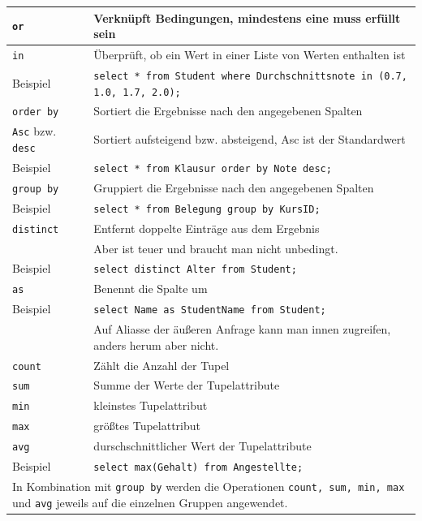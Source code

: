 \documentclass{article}
\begin{document}
\begin{center}
\begin{longtable}{|p{4cm}|p{7cm}|}
    \hline
    \texttt{or} & Verknüpft Bedingungen, mindestens eine muss erfüllt sein \\
    \hline
    \texttt{in} & Überprüft, ob ein Wert in einer Liste von Werten enthalten ist \\
    \hline
    Beispiel & \texttt{select * from Student where Durchschnittsnote in (0.7, 1.0, 1.7, 2.0);} \\
    \hline
    \texttt{order by} & Sortiert die Ergebnisse nach den angegebenen Spalten \\
    \hline
    \texttt{Asc} bzw. \texttt{desc} & Sortiert aufsteigend bzw. absteigend, Asc ist der Standardwert \\
    \hline
    Beispiel & \texttt{select * from Klausur order by Note desc;} \\
    \hline
    \texttt{group by} & Gruppiert die Ergebnisse nach den angegebenen Spalten \\
    \hline
    Beispiel & \texttt{select * from Belegung group by KursID;} \\
    \hline
    \texttt{distinct} & Entfernt doppelte Einträge aus dem Ergebnis \\
    & Aber ist teuer und braucht man nicht unbedingt.\\
    \hline
    Beispiel & \texttt{select distinct Alter from Student;} \\
    \hline
    \texttt{as} & Benennt die Spalte um \\
    Beispiel & \texttt{select Name as StudentName from Student;} \\
    & Auf Aliasse der äußeren Anfrage kann man innen zugreifen, anders herum aber nicht. \\
    \hline
    \texttt{count} & Zählt die Anzahl der Tupel \\
    \hline
    \texttt{sum} & Summe der Werte der Tupelattribute \\
    \hline
    \texttt{min} & kleinstes Tupelattribut \\
    \hline
    \texttt{max} & größtes Tupelattribut \\
    \hline
    \texttt{avg} & durschschnittlicher Wert der Tupelattribute \\
    \hline
    Beispiel & \texttt{select max(Gehalt) from Angestellte;} \\
    \hline
    \multicolumn{2}{|p{11cm}|}{In Kombination mit \texttt{group by} werden die Operationen \texttt{count, sum, min, max} und \texttt{avg} jeweils auf die einzelnen Gruppen angewendet.} \\

\end{longtable}
\end{center}
\end{document}

